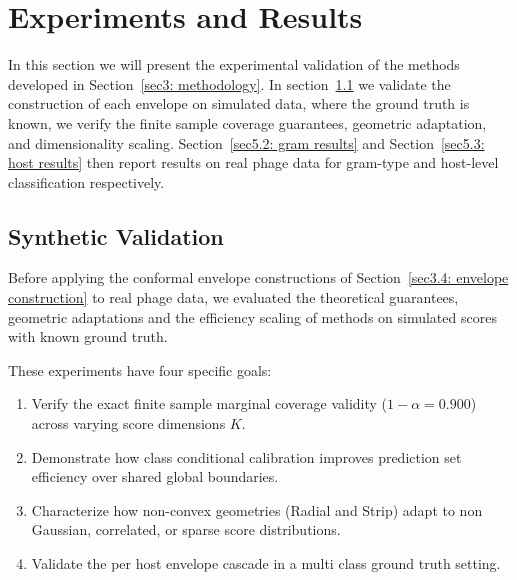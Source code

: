 

\chapter{Experiments and Results}
\label{sec5: experiments}

In this section we will present the experimental validation of the methods developed in Section~\ref{sec3: 
methodology}. In section~\ref{sec5.1: synthetic validation} we validate the construction of each envelope on simulated data, 
where the ground truth is known, we verify the finite sample coverage guarantees, geometric adaptation, and dimensionality 
scaling. Section~\ref{sec5.2: gram results} and Section~\ref{sec5.3: host results} then report results on real phage data 
for gram-type and host-level classification respectively.


\section{Synthetic Validation}
\label{sec5.1: synthetic validation}

Before applying the conformal envelope constructions of Section~\ref{sec3.4: envelope construction} to real phage 
data, we evaluated the theoretical guarantees, geometric adaptations and the efficiency scaling of methods on simulated 
scores with known ground truth. 

These experiments have four specific goals:
\begin{enumerate}[label=(\roman*)]
    \item Verify the exact finite sample marginal coverage validity ($1-\alpha = 0.900$) across varying score dimensions $K$.
    \item Demonstrate how class conditional calibration improves prediction set efficiency over shared global boundaries.
    \item Characterize how non-convex geometries (Radial and Strip) adapt to non Gaussian, correlated, or sparse score
          distributions.
    \item Validate the per host envelope cascade in a multi class ground truth setting.
\end{enumerate}

